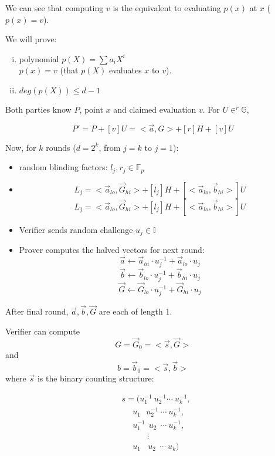 \documentclass{article}
\theoremstyle{definition}
\begin{document}
We can see that computing $v$ is the equivalent to evaluating $p(x)$ at $x$ ($p(x)=v$).

We will prove:
\begin{enumerate}[i.]
    \item polynomial $p(X) = \sum a_i X^i$\\
	$p(x) = v$ (that $p(X)$ evaluates $x$ to $v$).
    \item $deg(p(X)) \leq d-1$
\end{enumerate}


Both parties know $P$, point $x$ and claimed evaluation $v$. For $U \in^r \mathbb{G}$,

$$P' = P + [v] U = <\overrightarrow{a}, G> + [r]H + [v] U$$

Now, for $k$ rounds ($d=2^k$, from $j=k$ to $j=1$):
\begin{itemize}
    \item random blinding factors: $l_j, r_j \in \mathbb{F}_p$
    \item
	$$L_j = < \overrightarrow{a}_{lo}, \overrightarrow{G}_{hi}> + [l_j] H + [< \overrightarrow{a}_{lo}, \overrightarrow{b}_{hi}>] U$$
	$$L_j = < \overrightarrow{a}_{lo}, \overrightarrow{G}_{hi}> + [l_j] H + [< \overrightarrow{a}_{lo}, \overrightarrow{b}_{hi}>] U$$
    \item Verifier sends random challenge $u_j \in \mathbb{I}$
    \item Prover computes the halved vectors for next round:
	$$\overrightarrow{a} \leftarrow \overrightarrow{a}_{hi} \cdot u_j^{-1} + \overrightarrow{a}_{lo} \cdot u_j$$
	$$\overrightarrow{b} \leftarrow \overrightarrow{b}_{lo} \cdot u_j^{-1} + \overrightarrow{b}_{hi} \cdot u_j$$
	$$\overrightarrow{G} \leftarrow \overrightarrow{G}_{lo} \cdot u_j^{-1} + \overrightarrow{G}_{hi} \cdot u_j$$
\end{itemize}

After final round, $\overrightarrow{a}, \overrightarrow{b}, \overrightarrow{G}$ are each of length 1.

Verifier can compute
$$G = \overrightarrow{G}_0 = < \overrightarrow{s}, \overrightarrow{G} >$$
and $$b = \overrightarrow{b}_0 = < \overrightarrow{s}, \overrightarrow{b} >$$
where $\overrightarrow{s}$ is the binary counting structure:

\begin{align*}
    &s = (u_1^{-1} ~ u_2^{-1} \cdots ~u_k^{-1},\\
    &~~~~~~u_1 ~~~ u_2^{-1} ~\cdots ~u_k^{-1},\\
    &~~~~~~u_1^{-1} ~~ u_2 ~~\cdots ~u_k^{-1},\\
    &~~~~~~~~~~~~~~\vdots\\
    &~~~~~~u_1 ~~~~ u_2 ~~\cdots ~u_k)
\end{align*}
\end{document}
